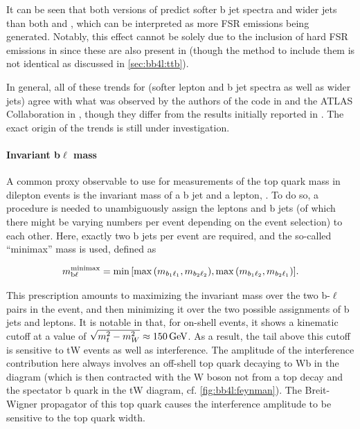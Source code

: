 It can be seen that both versions of \bbfourl predict softer b jet spectra and wider jets than both \tttWsum and \ttb, which can be interpreted as more FSR emissions being generated. Notably, this effect cannot be solely due to the inclusion of hard FSR emissions in \bbfourl since these are also present in \ttb (though the method to include them is not identical as discussed in \cref{sec:bb4l:ttb}). 

In general, all of these trends for \bbfourl (softer lepton and b jet spectra as well as wider jets) agree with what was observed by the authors of the code in  and the ATLAS Collaboration in , though they differ from the results initially reported in . The exact origin of the trends is still under investigation.

\paragraph{Invariant b$\ell$ mass} A common proxy observable to use for measurements of the top quark mass in dilepton events is the invariant mass of a b jet and a lepton, \mbl. To do so, a procedure is needed to unambiguously assign the leptons and b jets (of which there might be varying numbers per event depending on the event selection) to each other. Here, exactly two b jets per event are required, and the so-called ``minimax'' mass is used, defined as

\begin{equation}
    m_{\mathrm{b \ell}}^{\mathrm{minimax}} = \min{ \left[  \max{ \left( m_{b_1 \ell_1},
          m_{b_2 \ell_2} \right) }, \max{ \left( m_{b_1 \ell_2},
          m_{b_2 \ell_1} \right) } \right] }.
\end{equation}

This prescription amounts to maximizing the invariant mass over the two b-$\ell$ pairs in the event, and then minimizing it over the two possible assignments of b jets and leptons. It is notable in that, for on-shell \ttbar events, it shows a kinematic cutoff at a value of $\sqrt{\smash[b]{m_t^2 - m_W^2}} \approx \SI{150}{\GeV}$. As a result, the tail above this cutoff is sensitive to tW events as well as \tttW interference. The amplitude of the interference contribution here always involves an off-shell top quark decaying to Wb in the \ttbar diagram (which is then contracted with the W boson not from a top decay and the spectator b quark in the tW diagram, cf. \cref{fig:bb4l:feynman}). The Breit-Wigner propagator of this top quark causes the interference amplitude to be sensitive to the top quark width.

